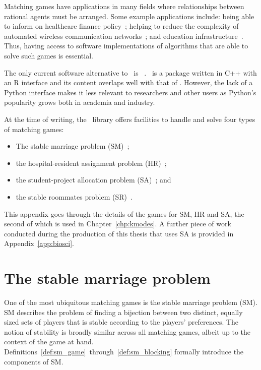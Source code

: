 Matching games have applications in many fields where relationships between
rational agents must be arranged. Some example applications include: being able
to inform on healthcare finance policy~\cite{Agarwal2017}; helping to reduce the
complexity of automated wireless communication networks~\cite{Bayat2016}; and
education infrastructure~\cite{Chiarandini2017,Hussain2019}. Thus, having access
to software implementations of algorithms that are able to solve such games is
essential.

The only current software alternative to \matching\ is
\matchingr~\cite{Tilly2018}. \matchingr\ is a package written in C++ with an R
interface and its content overlaps well with that of \matching. However, the
lack of a Python interface makes it less relevant to researchers and other users
as Python's popularity grows both in academia and industry.

At the time of writing, the \matching\ library offers facilities to handle and
solve four types of matching games:

\begin{itemize}
    \item The stable marriage problem (SM)~\cite{Gale1962};
    \item the hospital-resident assignment problem
        (HR)~\cite{Gale1962,Roth1984};
    \item the student-project allocation problem
        (SA)~\cite{Abraham2003,Abraham2007}; and
    \item the stable roommates problem (SR)~\cite{Irving1985}.
\end{itemize}

This appendix goes through the details of the games for SM, HR and SA, the
second of which is used in Chapter~\ref{chp:kmodes}. A further piece of work
conducted during the production of this thesis that uses SA is provided in
Appendix~\ref{app:biosci}.


\section{The stable marriage problem}\label{sec:stable_marriage}

One of the most ubiquitous matching games is the stable marriage problem (SM).
SM describes the problem of finding a bijection between two distinct, equally
sized sets of players that is stable according to the players' preferences. The
notion of stability is broadly similar across all matching games, albeit up to
the context of the game at hand.
Definitions~\ref{def:sm_game}~through~\ref{def:sm_blocking} formally introduce
the components of SM.


